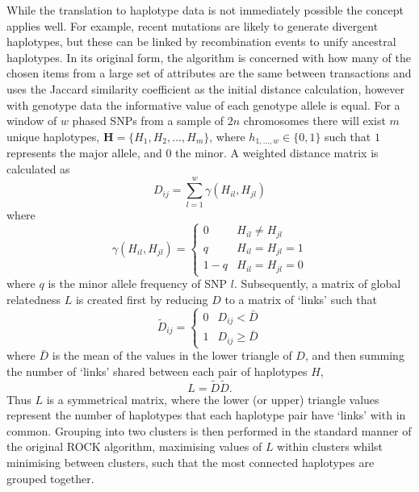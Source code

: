While the translation to haplotype data is not immediately possible the concept applies well. For example, recent mutations are likely to generate divergent haplotypes, but these can be linked by recombination events to unify ancestral haplotypes. In its original form, the algorithm is concerned with how many of the chosen items from a large set of attributes are the same between transactions and uses the Jaccard similarity coefficient as the initial distance calculation, however with genotype data the informative value of each genotype allele is equal. For a window of $w$ phased SNPs from a sample of $2n$ chromosomes there will exist $m$ unique haplotypes, $\mathbf{H} = \{H_{1}, H_{2}, ..., H_{m}\}$, where $h_{1,...,w} \in \{0, 1\}$ such that $1$ represents the major allele, and $0$ the minor. A weighted distance matrix is calculated as
\begin{equation}
D_{ij} = \sum^{w}_{l=1}\gamma(H_{il}, H_{jl})
\end{equation}
where
\begin{equation}\label{eq:gammadist}
\gamma(H_{il}, H_{jl}) = \left\{
\begin{array}{cc}
0 &  H_{il} \neq H_{jl}\\
q & H_{il} = H_{jl} = 1\\
1 - q & H_{il} = H_{jl} = 0
\end{array}\right.
\end{equation}
where $q$ is the minor allele frequency of SNP $l$. Subsequently, a matrix of global relatedness $L$ is created first by reducing $D$ to a matrix of `links' such that
\begin{equation}
\tilde{D}_{ij} = \left\{
\begin{array}{cc}
0 & D_{ij} < \bar{D}\\
1 & D_{ij} \geq \bar{D}
\end{array}\right.
\end{equation}
where $\bar{D}$ is the mean of the values in the lower triangle of $D$, and then summing the number of `links' shared between each pair of haplotypes $H$,
\begin{equation}
L = \tilde{D}\tilde{D}.
\end{equation}
Thus $L$ is a symmetrical matrix, where the lower (or upper) triangle values represent the number of haplotypes that each haplotype pair have `links' with in common. Grouping into two clusters is then performed in the standard manner of the original ROCK algorithm, maximising values of $L$ within clusters whilst minimising between clusters, such that the most connected haplotypes are grouped together.


